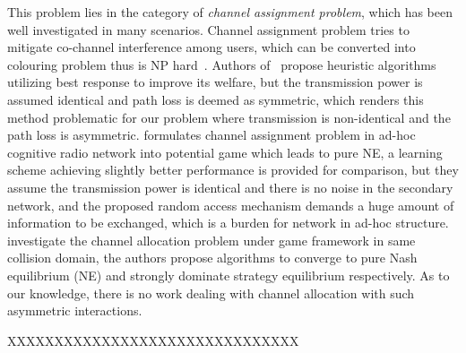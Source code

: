 This problem lies in the category of \textit{channel assignment problem}, which has been well investigated in many scenarios.
Channel assignment problem tries to mitigate co-channel interference among users, which can be converted into colouring problem thus is NP hard~\cite{Hyacinth}. 
Authors of~\cite{Ko_DistributedCA} propose heuristic algorithms utilizing best response to improve its welfare, but the transmission power is assumed identical and path loss is deemed as symmetric, which renders this method problematic for our problem where transmission is non-identical and the path loss is asymmetric.
\cite{CApotentialLearning_05dyspan} formulates channel assignment problem in ad-hoc cognitive radio network into potential game which leads to pure NE, a learning scheme achieving slightly better performance is provided for comparison, but they assume the transmission power is identical and there is no noise in the secondary network, and the proposed random access mechanism demands a huge amount of information to be exchanged, which is a burden for network in ad-hoc structure.
\cite{CA_Felegyhazi_07infocom, Wu_GOP_CA_08infocom} investigate the channel allocation problem under game framework in same collision domain, the authors propose algorithms to converge to pure Nash equilibrium (NE) and strongly dominate strategy equilibrium respectively. 
As to our knowledge, there is no work dealing with channel allocation with such asymmetric interactions. 


XXXXXXXXXXXXXXXXXXXXXXXXXXXXXXX


